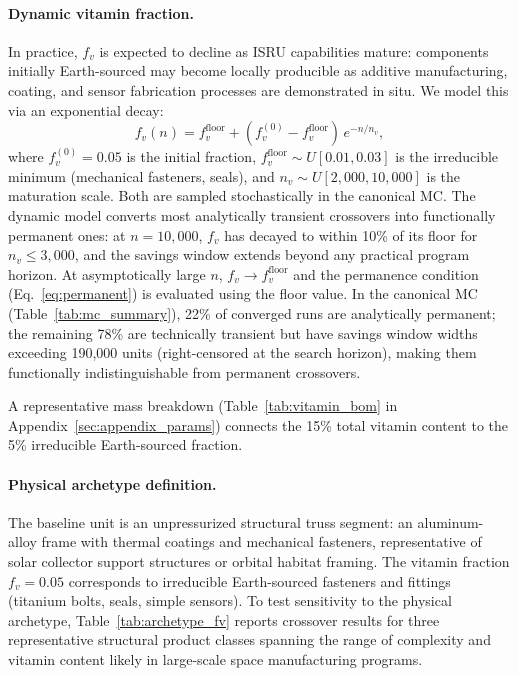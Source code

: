 \documentclass[preprint,12pt]{elsarticle}
\begin{document}
\paragraph{Dynamic vitamin fraction.} In practice, $f_v$ is expected to decline as ISRU capabilities mature: components initially Earth-sourced may become locally producible as additive manufacturing, coating, and sensor fabrication processes are demonstrated in situ. We model this via an exponential decay:
\begin{equation}
  f_v(n) = f_v^{\mathrm{floor}} + (f_v^{(0)} - f_v^{\mathrm{floor}}) \, e^{-n/n_v},
  \label{eq:vitamin_dynamic}
\end{equation}
where $f_v^{(0)} = 0.05$ is the initial fraction, $f_v^{\mathrm{floor}} \sim U[0.01, 0.03]$ is the irreducible minimum (mechanical fasteners, seals), and $n_v \sim U[2{,}000, 10{,}000]$ is the maturation scale. Both are sampled stochastically in the canonical MC. The dynamic model converts most analytically transient crossovers into functionally permanent ones: at $n = 10{,}000$, $f_v$ has decayed to within 10\% of its floor for $n_v \leq 3{,}000$, and the savings window extends beyond any practical program horizon. At asymptotically large $n$, $f_v \to f_v^{\mathrm{floor}}$ and the permanence condition (Eq.~\ref{eq:permanent}) is evaluated using the floor value. In the canonical MC (Table~\ref{tab:mc_summary}), 22\% of converged runs are analytically permanent; the remaining 78\% are technically transient but have savings window widths exceeding 190{,}000 units (right-censored at the search horizon), making them functionally indistinguishable from permanent crossovers.

A representative mass breakdown (Table~\ref{tab:vitamin_bom} in Appendix~\ref{sec:appendix_params}) connects the 15\% total vitamin content to the 5\% irreducible Earth-sourced fraction.

\paragraph{Physical archetype definition.}
\label{sec:archetype}
The baseline unit is an unpressurized structural truss segment: an aluminum-alloy frame with thermal coatings and mechanical fasteners, representative of solar collector support structures or orbital habitat framing. The vitamin fraction $f_v = 0.05$ corresponds to irreducible Earth-sourced fasteners and fittings (titanium bolts, seals, simple sensors). To test sensitivity to the physical archetype, Table~\ref{tab:archetype_fv} reports crossover results for three representative structural product classes spanning the range of complexity and vitamin content likely in large-scale space manufacturing programs.
\end{document}

